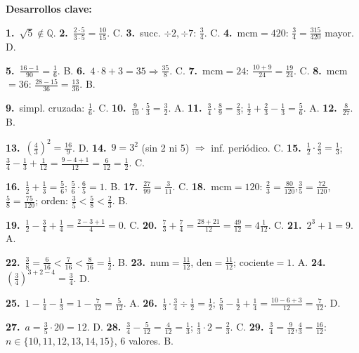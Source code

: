 \documentclass[11pt, letterpaper]{article}
\begin{document}
\medskip
\textbf{Desarrollos clave:}

\textbf{1.}~$\sqrt{5}\notin\mathbb{Q}$. \quad
\textbf{2.}~$\tfrac{2\cdot5}{3\cdot5}=\tfrac{10}{15}$. C. \quad
\textbf{3.}~succ. $\div2,\div7$: $\tfrac{3}{4}$. C. \quad
\textbf{4.}~mcm$=420$: $\tfrac{3}{4}=\tfrac{315}{420}$ mayor. D.

\textbf{5.}~$\tfrac{16-1}{90}=\tfrac{1}{6}$. B. \quad
\textbf{6.}~$4\cdot8+3=35\Rightarrow\tfrac{35}{8}$. C. \quad
\textbf{7.}~mcm$=24$: $\tfrac{10+9}{24}=\tfrac{19}{24}$. C. \quad
\textbf{8.}~mcm$=36$: $\tfrac{28-15}{36}=\tfrac{13}{36}$. B.

\textbf{9.}~simpl. cruzada: $\tfrac{1}{6}$. C. \quad
\textbf{10.}~$\tfrac{9}{10}\cdot\tfrac{5}{3}=\tfrac{3}{2}$. A. \quad
\textbf{11.}~$\tfrac{3}{4}\cdot\tfrac{8}{9}=\tfrac{2}{3}$; $\tfrac{1}{2}+\tfrac{2}{3}-\tfrac{1}{3}=\tfrac{5}{6}$. A. \quad
\textbf{12.}~$\tfrac{8}{27}$. B.

\textbf{13.}~$\left(\tfrac{4}{3}\right)^2=\tfrac{16}{9}$. D. \quad
\textbf{14.}~$9=3^2$ (sin 2 ni 5) $\Rightarrow$ inf. peri\'odico. C. \quad
\textbf{15.}~$\tfrac{1}{2}\cdot\tfrac{2}{3}=\tfrac{1}{3}$; $\tfrac{3}{4}-\tfrac{1}{3}+\tfrac{1}{12}=\tfrac{9-4+1}{12}=\tfrac{6}{12}=\tfrac{1}{2}$. C.

\textbf{16.}~$\tfrac{1}{2}+\tfrac{1}{3}=\tfrac{5}{6}$; $\tfrac{5}{6}\cdot\tfrac{6}{5}=1$. B. \quad
\textbf{17.}~$\tfrac{27}{99}=\tfrac{3}{11}$. C. \quad
\textbf{18.}~mcm$=120$: $\tfrac{2}{3}=\tfrac{80}{120}$,$\tfrac{3}{5}=\tfrac{72}{120}$,$\tfrac{5}{8}=\tfrac{75}{120}$; orden: $\tfrac{3}{5}<\tfrac{5}{8}<\tfrac{2}{3}$. B.

\textbf{19.}~$\tfrac{1}{2}-\tfrac{3}{4}+\tfrac{1}{4}=\tfrac{2-3+1}{4}=0$. C. \quad
\textbf{20.}~$\tfrac{7}{3}+\tfrac{7}{4}=\tfrac{28+21}{12}=\tfrac{49}{12}=4\tfrac{1}{12}$. C. \quad
\textbf{21.}~$2^3+1=9$. A.

\textbf{22.}~$\tfrac{3}{8}=\tfrac{6}{16}<\tfrac{7}{16}<\tfrac{8}{16}=\tfrac{1}{2}$. B. \quad
\textbf{23.}~num$=\tfrac{11}{12}$, den$=\tfrac{11}{12}$; cociente$=1$. A. \quad
\textbf{24.}~$\left(\tfrac{3}{4}\right)^{3+2-4}=\tfrac{3}{4}$. D.

\textbf{25.}~$1-\tfrac{1}{4}-\tfrac{1}{3}=1-\tfrac{7}{12}=\tfrac{5}{12}$. A. \quad
\textbf{26.}~$\tfrac{1}{3}\cdot\tfrac{3}{4}\div\tfrac{1}{2}=\tfrac{1}{2}$; $\tfrac{5}{6}-\tfrac{1}{2}+\tfrac{1}{4}=\tfrac{10-6+3}{12}=\tfrac{7}{12}$. D.

\textbf{27.}~$a=\tfrac{3}{5}\cdot20=12$. D. \quad
\textbf{28.}~$\tfrac{3}{4}-\tfrac{5}{12}=\tfrac{4}{12}=\tfrac{1}{3}$; $\tfrac{1}{3}\cdot2=\tfrac{2}{3}$. C. \quad
\textbf{29.}~$\tfrac{3}{4}=\tfrac{9}{12}$,$\tfrac{4}{3}=\tfrac{16}{12}$: $n\in\{10,11,12,13,14,15\}$, 6 valores. B.
\end{document}
